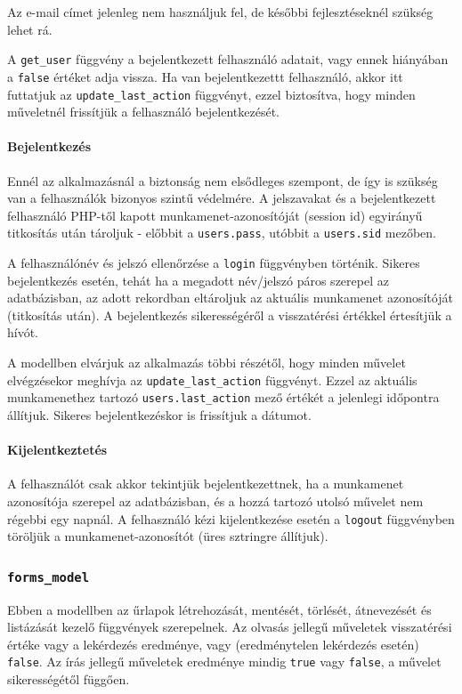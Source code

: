 \documentclass[12pt,a4paper,twoside]{article}
\begin{document}
Az e-mail címet jelenleg nem használjuk fel, de későbbi fejlesztéseknél szükség
lehet rá.

A \texttt{get\_user} függvény a bejelentkezett felhasználó adatait, vagy ennek
hiányában a \texttt{false} értéket adja vissza. Ha van bejelentkezettt
felhasználó, akkor itt futtatjuk az \texttt{update\_last\_action} függvényt,
ezzel biztosítva, hogy minden műveletnél frissítjük a felhasználó
bejelentkezését.

\paragraph{Bejelentkezés}
Ennél az alkalmazásnál a biztonság nem elsődleges szempont, de
így is szükség van a felhasználók bizonyos szintű védelmére. A jelszavakat és
a bejelentkezett felhasználó PHP-től kapott munkamenet-azonosítóját (session
id\cite{PHP-SID}) egyirányű titkosítás után tároljuk - előbbit a
\texttt{users.pass}, utóbbit a \texttt{users.sid} mezőben.

A felhasználónév és jelszó ellenőrzése a \texttt{login} függvényben
történik. Sikeres bejelentkezés esetén, tehát ha a megadott név/jelszó páros
szerepel az adatbázisban, az adott rekordban eltároljuk az aktuális munkamenet
azonosítóját (titkosítás után). A bejelentkezés sikerességéről a visszatérési
értékkel értesítjük a hívót.

A modellben elvárjuk az alkalmazás többi részétől, hogy minden művelet
elvégzésekor meghívja az \texttt{update\_last\_action} függvényt. Ezzel az
aktuális munkamenethez tartozó \texttt{users.last\_action} mező értékét a
jelenlegi időpontra állítjuk. Sikeres bejelentkezéskor is frissítjuk a dátumot.

\paragraph{Kijelentkeztetés}
A felhasználót csak akkor tekintjük bejelentkezettnek, ha a
munkamenet azonosítója szerepel az adatbázisban, és a hozzá tartozó utolsó
művelet nem régebbi egy napnál. A felhasználó kézi kijelentkezése esetén a
\texttt{logout} függvényben töröljük a munkamenet-azonosítót (üres sztringre
állítjuk).


\subsubsection{\texttt{forms\_model}}

Ebben a modellben az űrlapok létrehozását, mentését, törlését, átnevezését és
listázását kezelő függvények szerepelnek. Az olvasás jellegű műveletek
visszatérési értéke vagy a lekérdezés eredménye, vagy (eredménytelen lekérdezés
esetén) \texttt{false}. Az írás jellegű műveletek eredménye mindig \texttt{true}
vagy \texttt{false}, a művelet sikerességétől függően.
\end{document}
